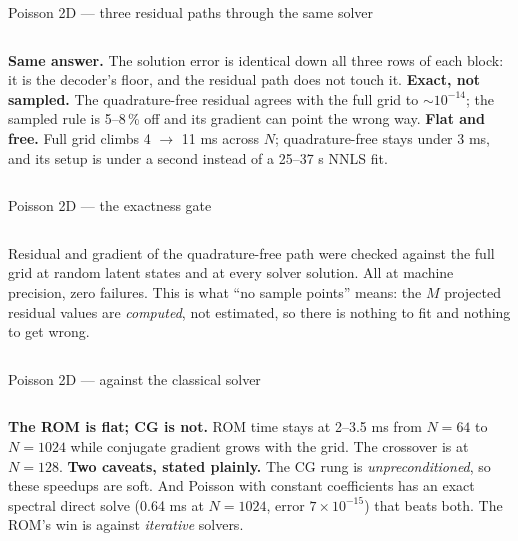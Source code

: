 \documentclass[10pt,aspectratio=169]{beamer}
\begin{document}
\begin{frame}{Poisson 2D --- three residual paths through the same solver}
  \centering\scriptsize
  

  \vspace{2mm}
  \begin{columns}[T]
    \small
    \textbf{Same answer.} The solution error is identical down all three rows of each block: it is the decoder's floor, and the residual path does not touch it.
    \small
    \textbf{Exact, not sampled.} The quadrature-free residual agrees with the full grid to $\sim 10^{-14}$; the sampled rule is 5--8\,\% off and its gradient can point the wrong way.
    \small
    \textbf{Flat and free.} Full grid climbs 4 $\to$ 11 ms across $N$; quadrature-free stays under 3 ms, and its setup is under a second instead of a 25--37 s NNLS fit.
  \end{columns}
\end{frame}

\begin{frame}{Poisson 2D --- the exactness gate}
  \centering\small
  

  \vspace{4mm}
  \begin{columns}[T]
    \small
    Residual and gradient of the quadrature-free path were checked against the full grid at random latent states and at every solver solution. All at machine precision, zero failures.
    \small
    This is what ``no sample points'' means: the $M$ projected residual values are \emph{computed}, not estimated, so there is nothing to fit and nothing to get wrong.
  \end{columns}
\end{frame}

\begin{frame}{Poisson 2D --- against the classical solver}
  \centering\small
  

  \vspace{3mm}
  \begin{columns}[T]
    \small
    \textbf{The ROM is flat; CG is not.} ROM time stays at 2--3.5 ms from $N=64$ to $N=1024$ while conjugate gradient grows with the grid. The crossover is at $N=128$.
    \small
    \textbf{Two caveats, stated plainly.} The CG rung is \emph{unpreconditioned}, so these speedups are soft. And Poisson with constant coefficients has an exact spectral direct solve (0.64 ms at $N=1024$, error $7\times10^{-15}$) that beats both. The ROM's win is against \emph{iterative} solvers.
  \end{columns}
\end{frame}
\end{document}
